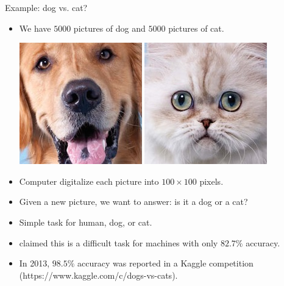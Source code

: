 \documentclass[first=dgreen,second=purple,logo=yellowexc]{aaltoslides}
\begin{document}
{\begin{frame}{Example: dog vs. cat?}
	\begin{itemize}
		\item We have $5000$ pictures of dog and $5000$ pictures of cat.
		\begin{center}
			\includegraphics[scale=0.3]{./figures/dog.jpg}
			\text{     }
			\includegraphics[scale=0.3]{./figures/cat.jpg}
		\end{center}
		\item Computer digitalize each picture into $100\times100$ pixels.
		\item Given a new picture, we want to answer: is it a dog or a cat?
		\item Simple task for human, dog, or cat.
		\item \citet{Golle08machine} claimed this is a difficult task for machines with only $82.7\%$ accuracy.
		\item In 2013, $98.5\%$ accuracy was reported in a Kaggle competition (https://www.kaggle.com/c/dogs-vs-cats).
	\end{itemize}
\end{frame}

}
\end{document}
